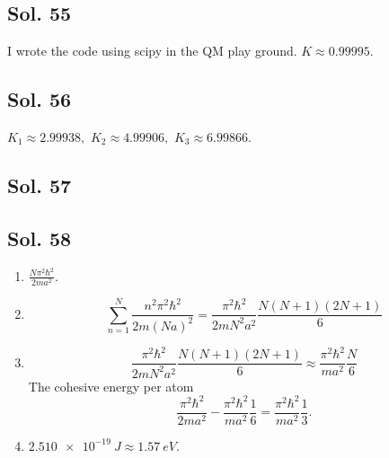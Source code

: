\subsection*{Sol. 55}
I wrote the code using scipy in the QM play ground. $K\approx0.99995.$

\subsection*{Sol. 56}
$K_1\approx2.99938,$ 
$K_2\approx4.99906,$ 
$K_3\approx6.99866.$ 

\subsection*{Sol. 57}

\subsection*{Sol. 58}
\begin{enumerate}
    \item $\frac{N\pi^2\hbar^2}{2ma^2}.$
    \item 
    $$
    \sum_{n=1}^N
    \frac{n^2\pi^2\hbar^2}{2m(Na)^2}
    =\frac{\pi^2\hbar^2}{2mN^2a^2}\frac{N(N+1)(2N+1)}{6}
    $$
    \item 
    $$
    \frac{\pi^2\hbar^2}{2mN^2a^2}\frac{N(N+1)(2N+1)}{6}
    \approx 
    \frac{\pi^2\hbar^2}{ma^2}\frac{N}{6}
    $$
    The cohesive energy per atom 
    $$
    \frac{\pi^2\hbar^2}{2ma^2}-\frac{\pi^2\hbar^2}{ma^2}\frac{1}{6}
    =\frac{\pi^2\hbar^2}{ma^2}\frac{1}{3}.
    $$
    \item $\qty{2.510e-19}{J}\approx \qty{1.57}{eV}.$
    
\end{enumerate}

